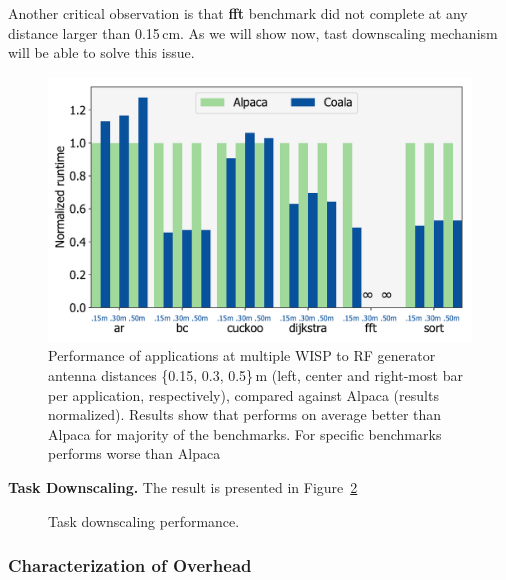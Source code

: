 Another critical observation is that \textbf{fft} benchmark did not complete at any distance larger than 0.15\,cm. As we will show now, \sys tast downscaling mechanism will be able to solve this issue.  

\begin{figure}
	\centering
	\includegraphics[width=\columnwidth]{figures/coala_alpaca_gcc}
	\caption{Performance of \sys applications at multiple WISP to RF generator antenna distances \{0.15, 0.3, 0.5\}\,m (left, center and right-most bar per application, respectively), compared against Alpaca (results normalized). Results show that \sys performs on average better than Alpaca for majority of the benchmarks. For specific benchmarks \sys performs worse than Alpaca }
	\label{fig:runtime}
\end{figure}

\textbf{Task Downscaling.} The result is presented in Figure~\ref{fig:task_downscaling} 

\begin{figure}
	\centering
	\caption{Task downscaling performance. }
	\label{fig:task_downscaling}
\end{figure}	

\subsubsection{Characterization of \sys Overhead}
\label{sec:coala_overhead}



